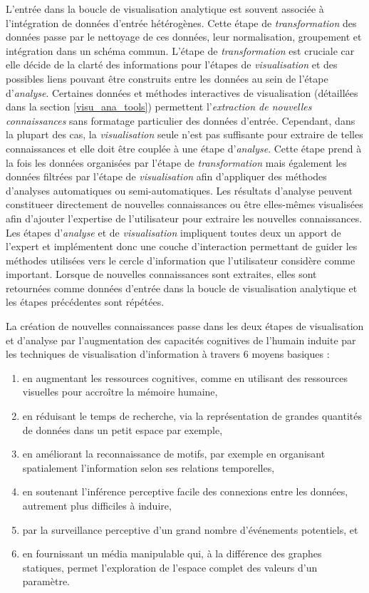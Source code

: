 L'entrée dans la boucle de visualisation analytique est souvent associée à l'intégration de données d'entrée hétérogènes. Cette étape de \textit{transformation} des données passe par le nettoyage de ces données, leur normalisation, groupement et intégration dans un schéma commun. L'étape de \textit{transformation} est cruciale car elle décide de la clarté des informations pour l'étapes de \textit{visualisation} et des possibles liens pouvant être construits entre les données au sein de l'étape d'\textit{analyse}. Certaines données et méthodes interactives de visualisation (détaillées dans la section \ref{visu_ana_tools}) permettent l'\textit{extraction de nouvelles connaissances} sans formatage particulier des données d'entrée. Cependant, dans la plupart des cas, la \textit{visualisation} seule n'est pas suffisante pour extraire de telles connaissances et elle doit être couplée à une étape d'\textit{analyse}. Cette étape prend à la fois les données organisées par l'étape de \textit{transformation} mais également les données filtrées par l'étape de \textit{visualisation} afin d'appliquer des méthodes d'analyses automatiques ou semi-automatiques. Les résultats d'analyse peuvent constitueer directement de nouvelles connaissances ou être elles-mêmes visualisées afin d'ajouter l'expertise de l'utilisateur pour extraire les nouvelles connaissances. Les étapes d'\textit{analyse} et de \textit{visualisation} impliquent toutes deux un apport de l'expert et implémentent donc une couche d'interaction permettant de guider les méthodes utilisées vers le cercle d'information que l'utilisateur considère comme important. Lorsque de nouvelles connaissances sont extraites, elles sont retournées comme données d'entrée dans la boucle de visualisation analytique et les étapes précédentes sont répétées.


La création de nouvelles connaissances passe dans les deux étapes de visualisation et d'analyse par l'augmentation des capacités cognitives de l'humain induite par les techniques de visualisation d'information à travers 6 moyens basiques \cite{card1999readings,cook_illuminating_2005}:

\begin{enumerate}
	\item en augmentant les ressources cognitives, comme en utilisant des ressources visuelles pour accroître la mémoire humaine,
	\item en réduisant le temps de recherche, via la représentation de grandes quantités de données dans un petit espace par exemple,
	\item en améliorant la reconnaissance de motifs, par exemple en organisant spatialement l'information selon ses relations temporelles,
	\item en soutenant l'inférence perceptive facile des connexions entre les données, autrement plus difficiles à induire,
	\item par la surveillance perceptive d'un grand nombre d'événements potentiels, et
	\item en fournissant un média manipulable qui, à la différence des graphes statiques, permet l'exploration de l'espace complet des valeurs d'un paramètre.
\end{enumerate}

